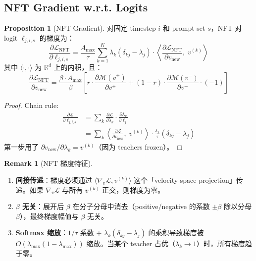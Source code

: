\documentclass[11pt,a4paper]{article}
\newcommand{\loss}{\mathcal{L}}
\newcommand{\R}{\mathbb{R}}
\theoremstyle{definition}
\newtheorem{remark}{Remark}
\newtheorem{proposition}{Proposition}
\begin{document}
\subsection{NFT Gradient w.r.t. Logits}

\begin{proposition}[NFT Gradient]
对固定 timestep $i$ 和 prompt set $s$，NFT 对 logit $\ell_{j,i,s}$ 的梯度为：
\begin{equation}
\boxed{
\frac{\partial \loss_{\mathrm{NFT}}}{\partial \ell_{j,i,s}} = \frac{A_{\max}}{\tau} \sum_{k=1}^K \lambda_k(\delta_{kj} - \lambda_j) \cdot \left\langle \frac{\partial \loss_{\mathrm{NFT}}}{\partial v_{\mathrm{new}}},\; v^{(k)} \right\rangle
}
\label{eq:nft_gradient}
\end{equation}
其中 $\langle \cdot, \cdot \rangle$ 为 $\R^d$ 上的内积，且：
\begin{equation}
\frac{\partial \loss_{\mathrm{NFT}}}{\partial v_{\mathrm{new}}} = \frac{\beta \cdot A_{\max}}{\beta} \left[r \cdot \frac{\partial \mathcal{M}(v^+)}{\partial v^+} + (1-r) \cdot \frac{\partial \mathcal{M}(v^-)}{\partial v^-} \cdot (-1)\right]
\end{equation}
\end{proposition}

\begin{proof}
Chain rule:
\begin{align}
\frac{\partial \loss}{\partial \ell_{j,i,s}} &= \sum_k \frac{\partial \loss}{\partial \lambda_k} \cdot \frac{\partial \lambda_k}{\partial \ell_j} \\
&= \sum_k \left\langle \frac{\partial \loss}{\partial v_{\mathrm{new}}},\; v^{(k)} \right\rangle \cdot \frac{\lambda_k}{\tau}(\delta_{kj} - \lambda_j)
\end{align}
第一步用了 $\partial v_{\mathrm{new}} / \partial \lambda_k = v^{(k)}$（因为 teachers frozen）。
\end{proof}

\begin{remark}[NFT 梯度特征]
\leavevmode
\begin{enumerate}
\item \textbf{间接传递}：梯度必须通过 $\langle \nabla_v \loss, v^{(k)} \rangle$ 这个「velocity-space projection」传递。如果 $\nabla_v \loss$ 与所有 $v^{(k)}$ 正交，则梯度为零。
\item \textbf{$\beta$ 无关}：展开后 $\beta$ 在分子分母中消去（positive/negative 的系数 $\pm\beta$ 除以分母 $\beta$），最终梯度幅值与 $\beta$ 无关。
\item \textbf{Softmax 缩放}：$1/\tau$ 系数 + $\lambda_k(\delta_{kj} - \lambda_j)$ 的乘积导致梯度被 $O(\lambda_{\max}(1-\lambda_{\max}))$ 缩放。当某个 teacher 占优（$\lambda_k \to 1$）时，所有梯度趋于零。
\end{enumerate}
\end{remark}
\end{document}
